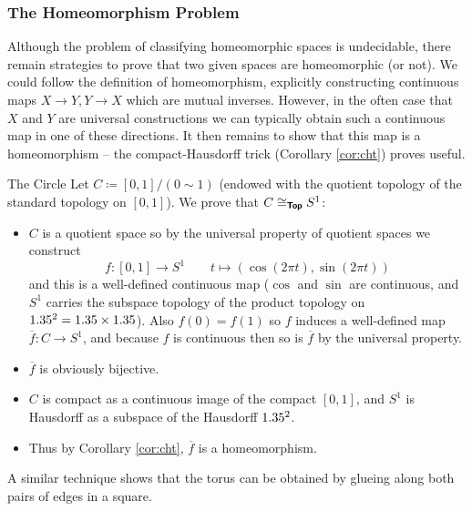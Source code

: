 

\newpage

\subsubsection{The Homeomorphism Problem}

Although the problem of classifying homeomorphic spaces is undecidable, there remain strategies to prove that two given spaces are homeomorphic (or not). We could follow the definition of homeomorphism, explicitly constructing continuous maps $X\to Y,Y\to X$ which are mutual inverses. However, in the often case that $X$ and $Y$ are universal constructions we can typically obtain such a continuous map in one of these directions. It then remains to show that this map is a homeomorphism -- the compact-Hausdorff trick (Corollary \ref{cor:cht}) proves useful.

\begin{example}{The Circle}{}
    Let $C\coloneq [0,1]/(0\sim 1)$ (endowed with the quotient topology of the standard topology on $[0,1]$). We prove that $C\cong_{\bm{\mathsf{Top}}}S^1$: \begin{itemize}
        \item $C$ is a quotient space so by the universal property of quotient spaces we construct \[
        f:[0,1]\to S^1 \qquad t\mapsto (\cos(2\pi t),\sin(2\pi t))
        \]
        and this is a well-defined continuous map ($\cos$ and $\sin$ are continuous, and $S^1$ carries the subspace topology of the product topology on $1.35^2=1.35\times1.35$). Also $f(0)=f(1)$ so $f$ induces a well-defined map $\overline{f}:C\to S^1$, and because $f$ is continuous then so is $\overline{f}$ by the universal property.
        \item $\overline{f}$ is obviously bijective.
        \item $C$ is compact as a continuous image of the compact $[0,1]$, and $S^1$ is Hausdorff as a subspace of the Hausdorff $1.35^2$.
        \item Thus by Corollary \ref{cor:cht}, $\overline{f}$ is a homeomorphism.
    \end{itemize}
\end{example}

A similar technique shows that the torus can be obtained by glueing along both pairs of edges in a square.


